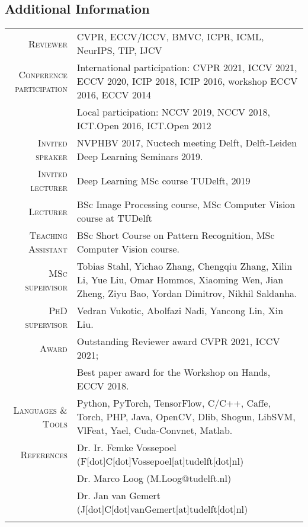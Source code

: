 \documentclass[a4paper, oneside, final]{scrartcl}
\begin{document}
\begin{center}
		\section{Additional Information}
		\begin{tabular}{r@{\hskip 0.3in}p{11.3cm}}
            \textsc{Reviewer}                   & CVPR, ECCV/ICCV, BMVC, ICPR, ICML, NeurIPS, TIP, IJCV\\
            \textsc{Conference participation}   & International participation: CVPR 2021, ICCV 2021, ECCV 2020, ICIP 2018, ICIP 2016, workshop ECCV 2016, ECCV 2014\\
                                                & Local participation: NCCV 2019, NCCV 2018, ICT.Open 2016, ICT.Open 2012\\
            \textsc{Invited speaker}            & NVPHBV 2017, Nuctech meeting Delft, Delft-Leiden Deep Learning Seminars 2019.\\
            \textsc{Invited lecturer}           & Deep Learning MSc course TUDelft, 2019\\
			\textsc{Lecturer}		            & BSc Image Processing course, MSc Computer Vision course at TUDelft\\
            \textsc{Teaching Assistant}         & BSc Short Course on Pattern Recognition, MSc Computer Vision course.\\ 
			\textsc{MSc supervisor}             & Tobias Stahl, Yichao Zhang, Chengqiu Zhang, Xilin Li, Yue Liu, Omar Hommos, Xiaoming Wen, Jian Zheng, Ziyu Bao, Yordan Dimitrov, Nikhil Saldanha.\\
			\textsc{PhD supervisor}             & Vedran Vukotic, Abolfazi Nadi, Yancong Lin, Xin Liu.\\[5px] 
            \textsc{Award}                      & Outstanding Reviewer award CVPR 2021, ICCV 2021;\\ 
                                                & Best paper award for the Workshop on Hands, ECCV 2018.\\  
			\textsc{Languages \& Tools}         & Python, PyTorch, TensorFlow, C\slash C++, Caffe, Torch, PHP, 
                                                Java, OpenCV, Dlib, Shogun, LibSVM, VlFeat, Yael, Cuda-Convnet, Matlab.\\

			\textsc{References} & Dr. Ir. Femke Vossepoel (F[dot]C[dot]Vossepoel[at]tudelft[dot]nl)\\
                                & Dr. Marco Loog (M.Loog@tudelft.nl)\\
                                & Dr. Jan van Gemert (J[dot]C[dot]vanGemert[at]tudelft[dot]nl)\\
			\multicolumn{2}{c}{}\\
		\end{tabular}
	\end{center}
\end{document}

